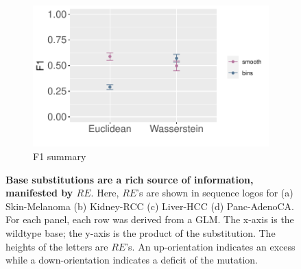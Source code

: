 \begin{figure}[htbp]
    \begin{subfigure}{.7\textwidth}
    \includegraphics[scale=0.8]{graphics/f1_gle.pdf}
    \caption{F1 summary}
    \label{fig:f1_gle}
    \end{subfigure}
    
    
    \caption{\textbf{Base substitutions are a rich source of information, manifested by $RE$}. Here, $RE$'s are shown in sequence logos for (a) Skin-Melanoma (b) Kidney-RCC (c) Liver-HCC (d) Panc-AdenoCA. For each panel, each row was derived from a GLM. The x-axis is the wildtype base; the y-axis is the product of the substitution. The heights of the letters are $RE$'s. An up-orientation indicates an excess while a down-orientation indicates a deficit of the mutation.}
    \label{fig:ml_gle}
\end{figure}